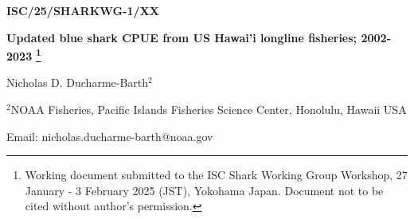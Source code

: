 \thispagestyle{empty}
\begin{flushright}
    \textbf{ISC/25/SHARKWG-1/XX}
\end{flushright}
\vspace{1in}

\begin{center}
    \textbf{Updated blue shark CPUE from US Hawai'i longline fisheries; 2002-2023}
    \textbf{\footnote{Working document submitted to the ISC Shark Working Group Workshop, 27 January - 3 February 2025
    (JST), Yokohama Japan. Document not to be cited without author’s permission.}}
    
    \vspace{0.25in}
    Nicholas D. Ducharme-Barth\begin{math}^2\end{math} %

    \vspace{0.25in}
    \begin{math}^2\end{math}NOAA Fisheries, Pacific Islands Fisheries Science Center, Honolulu, Hawaii USA

    \vspace{0.25in}
    Email: nicholas.ducharme-barth@noaa.gov
\end{center}

\begin{figure}[!hb]
    \begin{center}
    \end{center}
\end{figure}

\clearpage
